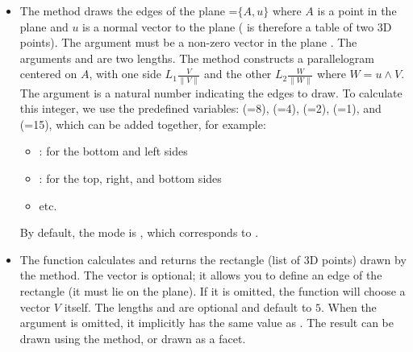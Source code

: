 \begin{itemize}
    \item The method  draws the edges of the plane =$\{A,u\}$ where $A$ is a point in the plane and $u$ is a normal vector to the plane ( is therefore a table of two 3D points). The argument  must be a non-zero vector in the plane . The arguments  and  are two lengths. The method constructs a parallelogram centered on $A$, with one side $L_1\frac{V}{\|V\|}$ and the other $L_2\frac{W}{\|W\|}$ where $W = u\wedge V$. The argument  is a natural number indicating the edges to draw. To calculate this integer, we use the predefined variables:  (=8),  (=4),  (=2),  (=1), and  (=15), which can be added together, for example:
\begin{itemize}
    \item {}: for the bottom and left sides
    \item {}: for the top, right, and bottom sides
    \item etc.
\end{itemize}
By default, the mode is , which corresponds to .

    \item The function  calculates and returns the rectangle (list of 3D points) drawn by the  method. The vector  is optional; it allows you to define an edge of the rectangle (it must lie on the plane). If it is omitted, the function will choose a vector $V$ itself. The lengths  and  are optional and default to $5$. When the argument  is omitted, it implicitly has the same value as . The result can be drawn using the  method, or drawn as a facet.
\end{itemize}    

